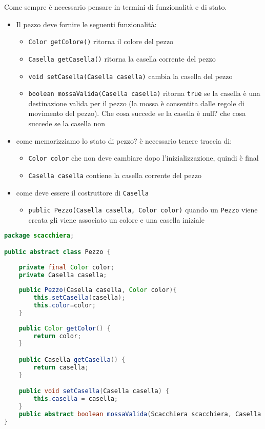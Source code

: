 \documentclass{article}
\begin{document}
Come sempre \`e necessario pensare in termini di funzionalit\`a e di stato. 
\begin{itemize}
\item Il  pezzo deve fornire le seguenti funzionalit\`a:
\begin{itemize}
\item \texttt{Color getColore()} ritorna il colore del pezzo 
\item \texttt{Casella getCasella()} ritorna la casella corrente del pezzo 
\item \texttt{void setCasella(Casella casella)} cambia la casella del pezzo
\item \texttt{boolean mossaValida(Casella casella)} ritorna \texttt{true} se la casella \`e una destinazione valida per il pezzo (la mossa \`e consentita dalle regole di movimento del pezzo). Che cosa succede se la casella \`e null?
che cosa succede se la casella non 
\end{itemize}
\item come memorizziamo lo stato di pezzo? \`e necessario tenere traccia di:
\begin{itemize}
\item \texttt{Color color} che non deve cambiare dopo l'inizializzazione, quindi \`e final
\item \texttt{Casella casella} contiene la casella corrente del pezzo
\end{itemize}
\item come deve essere il costruttore di \texttt{Casella}
\begin{itemize}
\item \texttt{public Pezzo(Casella casella, Color color)} quando un \texttt{Pezzo} viene creata gli viene associato un colore e una casella iniziale
\end{itemize}
\end{itemize}

\begin{lstlisting}[language=Java,escapechar=|]
package scacchiera;

public abstract class Pezzo {
	
	private final Color color;
	private Casella casella;
	
	public Pezzo(Casella casella, Color color){
		this.setCasella(casella);
		this.color=color;
	}
	
	public Color getColor() {
		return color;
	}

	public Casella getCasella() {
		return casella;
	}

	public void setCasella(Casella casella) {
		this.casella = casella;
	}
	public abstract boolean mossaValida(Scacchiera scacchiera, Casella destinazione);
}

\end{lstlisting}
\end{document}
